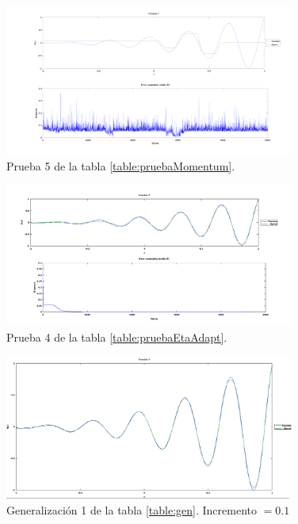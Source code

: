 \documentclass[11pt,a4paper]{article}
\begin{document}
{\begin{figure}[ht]
\centering
\includegraphics[width=0.85\textwidth]{img/PruebaRecu28.png}
\caption{\label{fig:pruebaRecu28} Prueba 5 de la tabla \ref{table:pruebaMomentum}.}
\end{figure}

\begin{figure}[ht]
\centering
\includegraphics[width=0.85\textwidth]{img/PruebaRecu39.png}
\caption{\label{fig:pruebaRecu39} Prueba 4 de la tabla \ref{table:pruebaEtaAdapt}.}
\end{figure}


\begin{figure}[ht]
\centering
\includegraphics[width=0.85\textwidth]{img/gen1.png}
\caption{\label{fig:gen1} Generalización 1 de la tabla \ref{table:gen}. Incremento $= 0.1$}
\end{figure}

}
\end{document}
